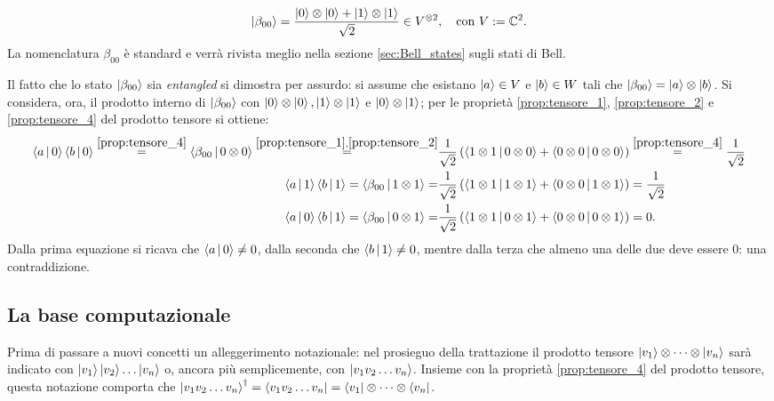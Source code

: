 \begin{align*}
\ket{\beta_{00}} = \frac{\ket{0}\otimes\ket{0} + \ket{1}\otimes\ket{1}}{\sqrt{2}} \in V^{\otimes 2}, \quad \text{con } V:= \mathbb{C}^{2}.
\end{align*}
La nomenclatura $\beta_{00}$ è standard e verrà rivista meglio nella sezione \ref{sec:Bell_states} sugli stati di Bell.

Il fatto che lo stato $\ket{\beta_{00}}$ sia \textit{entangled} si dimostra per assurdo: si assume che esistano ${\ket{a} \in V}$ e ${\ket{b} \in W}$ tali che ${\ket{\beta_{00}} = \ket{a} \otimes \ket{b}}$.
Si considera, ora, il prodotto interno di $\ket{\beta_{00}}$ con $\ket{0}\otimes\ket{0}, \ket{1}\otimes\ket{1}$ e $\ket{0}\otimes\ket{1}$; per le proprietà \ref{prop:tensore_1}, \ref{prop:tensore_2} e \ref{prop:tensore_4} del prodotto tensore si ottiene: 
\begin{align*}
 \braket{a\,}{\, 0}\braket{b\,}{\, 0} \stackrel{\ref{prop:tensore_4}}{=} \braket{\beta_{00}\,}{\, 0\otimes 0} \stackrel{\ref{prop:tensore_1}, \ref{prop:tensore_2}}{=}& \frac{1}{\sqrt{2}}\left(\braket{1\otimes 1\,}{\, 0\otimes 0} + \braket{0\otimes 0\,}{\, 0\otimes 0} \right) \stackrel{\ref{prop:tensore_4}}{=} \frac{1}{\sqrt{2}} \\
 \braket{a\,}{\, 1}\braket{b\,}{\, 1} = \braket{\beta_{00}\,}{\, 1\otimes 1} =& \frac{1}{\sqrt{2}}\left(\braket{1\otimes 1\,}{\, 1\otimes 1} + \braket{0\otimes 0\,}{\, 1\otimes 1} \right) = \frac{1}{\sqrt{2}} \\
 \braket{a\,}{\, 0}\braket{b\,}{\, 1} = \braket{\beta_{00}\,}{\, 0\otimes 1} =& \frac{1}{\sqrt{2}}\left(\braket{1\otimes 1\,}{\, 0\otimes 1} + \braket{0\otimes 0\,}{\, 0\otimes 1} \right) = 0.
\end{align*}
Dalla prima equazione si ricava che ${\braket{a\,}{\, 0} \neq 0}$, dalla seconda che ${\braket{b\,}{\, 1} \neq 0}$, mentre dalla terza che almeno una delle due deve essere 0: una contraddizione.

\subsection{La base computazionale}\label{sec:computational_basis}
Prima di passare a nuovi concetti un alleggerimento notazionale: nel prosieguo della trattazione il prodotto tensore $\ket{v_1} \otimes \dots \otimes \ket{v_n}$ sarà indicato con $\ket{v_1}\ket{v_2} \dots \ket{v_n}$ o, ancora più semplicemente, con $\ket{v_1 v_2 \dots v_n}$.
Insieme con la proprietà \ref{prop:tensore_4} del prodotto tensore, questa notazione comporta che $\ket{v_1 v_2 \dots v_n}^\dagger = \bra{v_1 v_2 \dots v_n} = \bra{v_1} \otimes \dots \otimes \bra{v_n}$.

